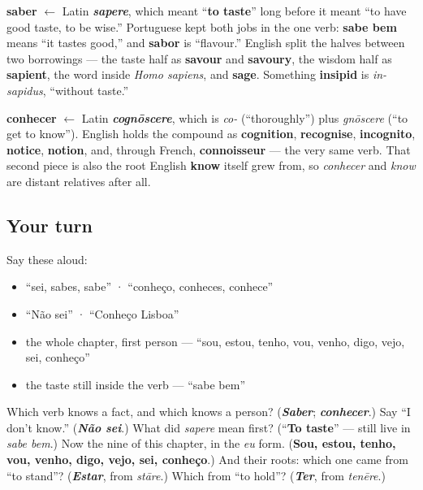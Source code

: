 \begin{cousinweb}
\textbf{saber} $\leftarrow$ Latin \emph{\textbf{sapere}}, which meant \textquotedblleft{}\textbf{to taste}\textquotedblright{} long before it meant \textquotedblleft{}to have good taste, to be wise.\textquotedblright{} Portuguese kept both jobs in the one verb: \textbf{sabe bem} means \textquotedblleft{}it tastes good,\textquotedblright{} and \textbf{sabor} is \textquotedblleft{}flavour.\textquotedblright{} English split the halves between two borrowings — the taste half as \textbf{savour} and \textbf{savoury}, the wisdom half as \textbf{sapient}, the word inside \emph{Homo sapiens}, and \textbf{sage}. Something \textbf{insipid} is \emph{in-sapidus}, \textquotedblleft{}without taste.\textquotedblright{}

\textbf{conhecer} $\leftarrow$ Latin \emph{\textbf{cognōscere}}, which is \emph{co-} (\textquotedblleft{}thoroughly\textquotedblright{}) plus \emph{gnōscere} (\textquotedblleft{}to get to know\textquotedblright{}). English holds the compound as \textbf{cognition}, \textbf{recognise}, \textbf{incognito}, \textbf{notice}, \textbf{notion}, and, through French, \textbf{connoisseur} — the very same verb. That second piece is also the root English \textbf{know} itself grew from, so \emph{conhecer} and \emph{know} are distant relatives after all.
\end{cousinweb}

\subsection*{Your turn}
Say these aloud:

\begin{itemize}
\raggedright
  \item \textquotedblleft{}sei, sabes, sabe\textquotedblright{} · \textquotedblleft{}conheço, conheces, conhece\textquotedblright{}
  \item \textquotedblleft{}Não sei\textquotedblright{} · \textquotedblleft{}Conheço Lisboa\textquotedblright{}
  \item the whole chapter, first person — \textquotedblleft{}sou, estou, tenho, vou, venho, digo, vejo, sei, conheço\textquotedblright{}
  \item the taste still inside the verb — \textquotedblleft{}sabe bem\textquotedblright{}
\end{itemize}

\begin{tcolorbox}[breakable,colback=teal!4,colframe=teal!35!black,title={Before you move on}]
Which verb knows a fact, and which knows a person? (\emph{\textbf{Saber}}; \emph{\textbf{conhecer}}.) Say \textquotedblleft{}I don't know.\textquotedblright{} (\emph{\textbf{Não sei}}.) What did \emph{sapere} mean first? (\textquotedblleft{}\textbf{To taste}\textquotedblright{} — still live in \emph{sabe bem}.) Now the nine of this chapter, in the \emph{eu} form. (\textbf{Sou, estou, tenho, vou, venho, digo, vejo, sei, conheço}.) And their roots: which one came from \textquotedblleft{}to stand\textquotedblright{}? (\emph{\textbf{Estar}}, from \emph{stāre}.) Which from \textquotedblleft{}to hold\textquotedblright{}? (\emph{\textbf{Ter}}, from \emph{tenēre}.)
\end{tcolorbox}
